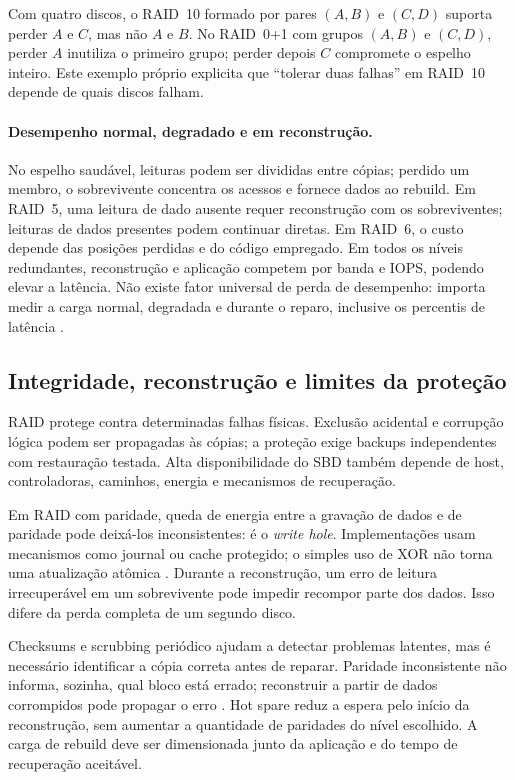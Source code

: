 \documentclass[titlepage]{article}
\begin{document}
Com quatro discos, o RAID~10 formado por pares $(A,B)$ e $(C,D)$ suporta perder $A$ e $C$, mas não $A$ e $B$. No RAID~0+1 com grupos $(A,B)$ e $(C,D)$, perder $A$ inutiliza o primeiro grupo; perder depois $C$ compromete o espelho inteiro. Este exemplo próprio explicita que ``tolerar duas falhas'' em RAID~10 depende de quais discos falham.

\paragraph{Desempenho normal, degradado e em reconstrução.}
No espelho saudável, leituras podem ser divididas entre cópias; perdido um membro, o sobrevivente concentra os acessos e fornece dados ao rebuild. Em RAID~5, uma leitura de dado ausente requer reconstrução com os sobreviventes; leituras de dados presentes podem continuar diretas. Em RAID~6, o custo depende das posições perdidas e do código empregado. Em todos os níveis redundantes, reconstrução e aplicação competem por banda e IOPS, podendo elevar a latência. Não existe fator universal de perda de desempenho: importa medir a carga normal, degradada e durante o reparo, inclusive os percentis de latência \cite{redhat_raid,corbett2004}.
\subsection{Integridade, reconstrução e limites da proteção}
RAID protege contra determinadas falhas físicas. Exclusão acidental e corrupção lógica podem ser propagadas às cópias; a proteção exige backups independentes com restauração testada. Alta disponibilidade do SBD também depende de host, controladoras, caminhos, energia e mecanismos de recuperação.

Em RAID com paridade, queda de energia entre a gravação de dados e de paridade pode deixá-los inconsistentes: é o \textit{write hole}. Implementações usam mecanismos como journal ou cache protegido; o simples uso de XOR não torna uma atualização atômica \cite{spdk_raid5f}. Durante a reconstrução, um erro de leitura irrecuperável em um sobrevivente pode impedir recompor parte dos dados. Isso difere da perda completa de um segundo disco.

Checksums e scrubbing periódico ajudam a detectar problemas latentes, mas é necessário identificar a cópia correta antes de reparar. Paridade inconsistente não informa, sozinha, qual bloco está errado; reconstruir a partir de dados corrompidos pode propagar o erro \cite{krioukov2008}. Hot spare reduz a espera pelo início da reconstrução, sem aumentar a quantidade de paridades do nível escolhido. A carga de rebuild deve ser dimensionada junto da aplicação e do tempo de recuperação aceitável.
\end{document}
